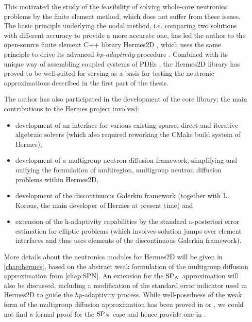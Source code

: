 This motivated the study of the feasibility of solving whole-core neutronics
problems by the finite element method, which does not suffer from these issues. The basic principle underlying the
nodal method, i.e. comparing two solutions with different accuracy to provide a more accurate one, has led the author to
the open-source finite element C++ library Hermes2D \cite{Hermes-project} , which uses the
same principle to drive its advanced \textit{hp-adaptivity} procedure \cite{Hermes-hanging-nodes}. Combined with its unique way of assembling coupled
systems of PDEs \cite{Hermes-thermoelasticity}, the Hermes2D library has proved to be well-suited for
serving as a basis for testing the neutronic approximations described in the first part of the thesis.

The author has also participated in the development of the core library; the main contributions to the Hermes
project involved:
\begin{itemize}
    \item development of an interface for various existing sparse,
direct and iterative algebraic solvers (which also required reworking the CMake build system of Hermes),
	\item development of a multigroup neutron diffusion framework, simplifying and unifying the formulation of
	multiregion, multigroup neutron diffusion problems within Hermes2D,
	\item development of the discontinuous Galerkin framework (together with L. Korous, the main developer of Hermes at
	present time) and
	\item extension of the h-adaptivity capabilities by the standard a-posteriori error estimation for elliptic problems (which
involves solution jumps over element interfaces and thus uses elements of the discontinuous Galerkin framework). 
\end{itemize}
More details about the neutronics modules for Hermes2D will be given in
\cref{chap:hermes}, based on the abstract weak formulation of the multigroup diffusion approximation from
\cref{chap:SPN}. An extension for the $\text{SP}_{N}$ approximation will also be discussed, including a modification of the
standard error indicator used in Hermes2D to guide the $hp$-adaptivity process. While well-posedness
of the weak form of the multigroup diffusion approximation has been proved in \cite[Chap.
VII]{DautrayLions2} or \cite{Bourhrara1}, we could not find a formal proof for the $\text{SP}_{N}$ case and hence provide one in 
.

